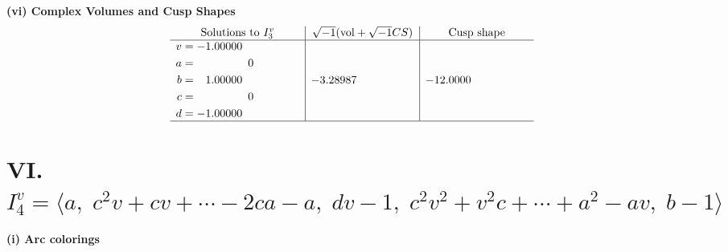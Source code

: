 \documentclass[1p]{elsarticle_modified}
\theoremstyle{definition}
\newcommand{\I}{\sqrt{-1}}
\begin{document}
\newpage\flushleft \textbf{(vi) Complex Volumes and Cusp Shapes}
$$\begin{array}{c|c|c}  
\text{Solutions to }I^v_{3}& \I (\text{vol} + \sqrt{-1}CS) & \text{Cusp shape}\\
 \hline 
\begin{aligned}
v &= -1.00000\phantom{ +0.000000I} \\
a &= \phantom{-0.000000 } 0 \\
b &= \phantom{-}1.00000\phantom{ +0.000000I} \\
c &= \phantom{-0.000000 } 0 \\
d &= -1.00000\phantom{ +0.000000I}\end{aligned}
 & -3.28987\phantom{ +0.000000I} & -12.0000\phantom{ +0.000000I}\\
 \hline 
 \end{array}$$\newpage\newpage\renewcommand{\arraystretch}{1}
\centering \section*{VI. $I^v_{4}= \langle a,\;c^2 v+c v+\cdots-2 c a- a,\;d v-1,\;c^2 v^2+v^2 c+\cdots+a^2- a v,\;b-1 \rangle$}
\flushleft \textbf{(i) Arc colorings}\\
\end{document}
